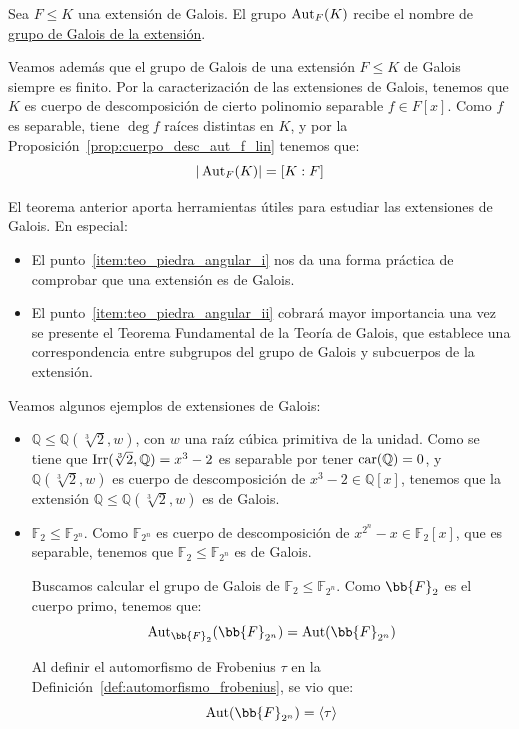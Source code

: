 \begin{definicion}
    Sea $F\leq K$ una extensión de Galois. El grupo $\operatorname{Aut}_F(K)$ recibe el nombre de \underline{grupo de Galois de la extensión}.    
\end{definicion}

Veamos además que el grupo de Galois de una extensión $F\leq K$ de Galois siempre es finito. Por la caracterización de las extensiones de Galois, tenemos que $K$ es cuerpo de descomposición de cierto polinomio separable $f\in F[x]$. Como $f$ es separable, tiene $\deg f$ raíces distintas en $K$, y por la Proposición~\ref{prop:cuerpo_desc_aut_f_lin} tenemos que:
\begin{equation*}
    |\operatorname{Aut}_F(K)| = [K:F]
\end{equation*}

El teorema anterior aporta herramientas útiles para estudiar las extensiones de Galois. En especial:
\begin{itemize}
    \item El punto~\ref{item:teo_piedra_angular_i} nos da una forma práctica de comprobar que una extensión es de Galois.
    \item El punto~\ref{item:teo_piedra_angular_ii} cobrará mayor importancia una vez se presente el Teorema Fundamental de la Teoría de Galois, que establece una correspondencia entre subgrupos del grupo de Galois y subcuerpos de la extensión.
\end{itemize}

\begin{ejemplo} Veamos algunos ejemplos de extensiones de Galois:\label{ejemplo:extensiones_de_galois}
    \begin{itemize}
        \item $\mathbb{Q}\leq \mathbb{Q}(\sqrt[3]{2},w)$, con $w$ una raíz cúbica primitiva de la unidad. Como se tiene que $\operatorname{Irr}(\sqrt[3]{2},\mathbb{Q}) = x^3-2$ es separable por tener $\operatorname{car}(\mathbb{Q})=0$, y $\mathbb{Q}(\sqrt[3]{2},w)$ es cuerpo de descomposición de $x^3-2\in \mathbb{Q}[x]$, tenemos que la extensión $\mathbb{Q}\leq \mathbb{Q}(\sqrt[3]{2},w)$ es de Galois.
        \item $\mathbb{F}_2\leq \mathbb{F}_{2^n}$. Como $\mathbb{F}_{2^n}$ es cuerpo de descomposición de $x^{2^n}-x\in \mathbb{F}_2[x]$, que es separable, tenemos que $\mathbb{F}_2\leq \mathbb{F}_{2^n}$ es de Galois.
        
        Buscamos calcular el grupo de Galois de $\mathbb{F}_2\leq \mathbb{F}_{2^n}$. Como $\bb{F}_2$ es el cuerpo primo, tenemos que:
        \begin{equation*}
            \Aut_{\bb{F}_2}(\bb{F}_{2^n}) = \Aut(\bb{F}_{2^n})
        \end{equation*}

        Al definir el automorfismo de Frobenius $\tau$ en la Definición~\ref{def:automorfismo_frobenius}, se vio que:
        \begin{equation*}
            \Aut(\bb{F}_{2^n}) = \langle \tau \rangle
        \end{equation*}
    \end{itemize}    
\end{ejemplo}

